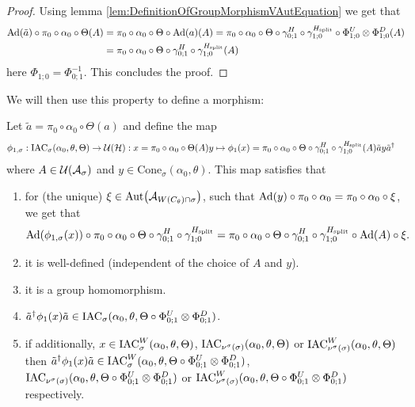 \documentclass[11pt,a4paper,twoside]{article}
\numberwithin{equation}{section}
\begin{document}
	\begin{proof}
		Using lemma \ref{lem:DefinitionOfGroupMorphismVAutEquation} we get that
		\begin{align}
			\Ad{\tilde{a}}\circ\pi_0\circ\alpha_0\circ\Theta(A)&=\pi_0\circ\alpha_0\circ\Theta\circ\Ad{a}(A)=\pi_0\circ\alpha_0\circ\Theta\circ\gamma^H_{0;1}\circ\gamma^{\Hsplit}_{1;0}\circ\Phi^U_{1;0}\otimes\Phi^D_{1;0}(A)\\
			\nonumber
			&=\pi_0\circ\alpha_0\circ\Theta\circ\gamma^H_{0;1}\circ\gamma^{\Hsplit}_{1;0}(A)
		\end{align}
		here $\Phi_{1;0}=\Phi_{0;1}^{-1}$. This concludes the proof.
	\end{proof}
	We will then use this property to define a morphism:
	\begin{lemma}\label{lem:DefinitionOfGroupMorphism}
		Let $\tilde{a}=\pi_0\circ\alpha_0\circ\Theta(a)$ and define the map
		\begin{align}
			\phi_{1,\sigma}&:\textrm{IAC}_\sigma(\alpha_0,\theta,\Theta) \rightarrow \mathcal U(\mathcal H):x=\pi_0\circ\alpha_0\circ\Theta(A)y\mapsto \phi_1(x)=\pi_0\circ\alpha_0\circ\Theta\circ\gamma^H_{0;1}\circ\gamma^{{H_{\text{split}}}}_{1;0}(A)\tilde{a}y\tilde{a}^\dagger
		\end{align}
		where $A\in\mathcal U(\mathcal A_\sigma)$ and $y\in\textrm{Cone}_\sigma(\alpha_0,\theta)$. This map satisfies that
		\begin{enumerate}
			\item  for (the unique) $\xi\in\Aut{\AA_{W(C_\theta)\cap\sigma}}$, such that $\Ad{y}\circ\pi_0\circ\alpha_0=\pi_0\circ\alpha_0\circ\xi$, we get that
			\begin{equation}\label{eq:ConditionDefinitionOfGroupMorphism}
				\Ad{\phi_{1,\sigma}(x)}\circ\pi_0\circ\alpha_0\circ\Theta\circ\gamma^H_{0;1}\circ\gamma^{\Hsplit}_{1;0}=\pi_0\circ\alpha_0\circ\Theta\circ\gamma^H_{0;1}\circ\gamma^{\Hsplit}_{1;0}\circ\Ad{A}\circ\xi.
			\end{equation}
			\item it is well-defined (independent of the choice of $A$ and $y$).
			\item it is a group homomorphism.
			\item $\tilde{a}^\dagger \phi_1(x)\tilde{a}\in\textrm{IAC}_\sigma(\alpha_0,\theta,\Theta\circ \Phi^U_{0;1}\otimes\Phi^D_{0;1})$.
			\item if additionally, $x\in \textrm{IAC}_\sigma^W(\alpha_0,\theta,\Theta)$, $\textrm{IAC}_{\nu^{\sigma}(\sigma)}(\alpha_0,\theta,\Theta)$ or $\textrm{IAC}_{\nu^{\sigma}(\sigma)}^W (\alpha_0,\theta,\Theta)$ then  $\tilde{a}^\dagger \phi_1(x)\tilde{a}\in\textrm{IAC}_\sigma^W(\alpha_0,\theta,\Theta\circ \Phi^U_{0;1}\otimes\Phi^D_{0;1})$, $\textrm{IAC}_{\nu^{\sigma}(\sigma)}(\alpha_0,\theta,\Theta\circ \Phi^U_{0;1}\otimes\Phi^D_{0;1})$ or $\textrm{IAC}_{\nu^{\sigma}(\sigma)}^W (\alpha_0,\theta,\Theta\circ \Phi^U_{0;1}\otimes\Phi^D_{0;1})$ respectively.
		\end{enumerate}
	\end{lemma}
\end{document}
